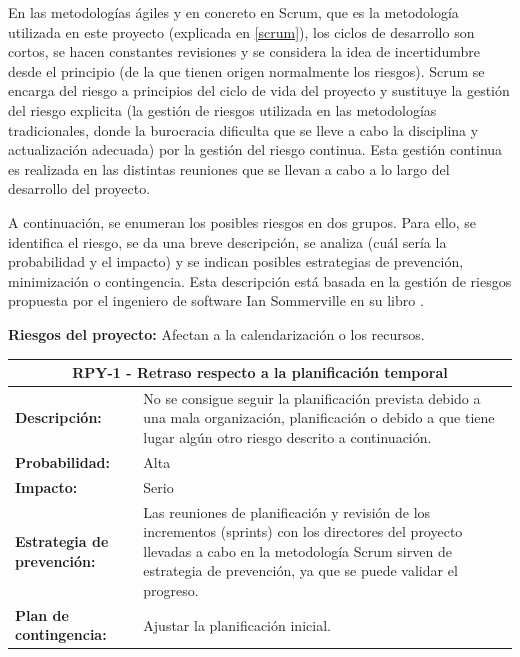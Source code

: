 En las metodologías ágiles y en concreto en Scrum, que es la metodología utilizada en este proyecto (explicada en \ref{scrum}), los ciclos de desarrollo son cortos, se hacen constantes revisiones y se considera la idea de incertidumbre desde el principio (de la que tienen origen normalmente los riesgos). Scrum se encarga del riesgo a principios del ciclo de vida del proyecto y sustituye la gestión del riesgo explicita (la gestión de riesgos utilizada en las metodologías tradicionales, donde la burocracia dificulta que se lleve a cabo la disciplina y actualización adecuada) por la gestión del riesgo continua. Esta gestión continua es realizada en las distintas reuniones que se llevan a cabo a lo largo del desarrollo del proyecto.

A continuación, se enumeran los posibles riesgos en dos grupos. Para ello, se identifica el riesgo, se da una breve descripción, se analiza (cuál sería la probabilidad y el impacto) y se indican posibles estrategias de prevención, minimización o contingencia. Esta descripción está basada en la gestión de riesgos propuesta por el ingeniero de software Ian Sommerville en su libro \cite{sommerville}.

\noindent
\textbf{Riesgos del proyecto:} Afectan a la calendarización o los recursos.

\begin{table}[H]
	\begin{tabular}{| p{4cm}| p{10cm} |}
		\hline
		\multicolumn{2}{|c|}{\textbf{RPY-1} - Retraso respecto a la planificación temporal} \\ \hline
		\textbf{Descripción:} & No se consigue seguir la planificación prevista debido a una mala organización, planificación o debido a que tiene lugar algún otro riesgo descrito a continuación. \\ \hline
		\textbf{Probabilidad:} & Alta \\ \hline
		\textbf{Impacto:} & Serio \\ \hline
		\textbf{Estrategia de prevención:} & Las reuniones de planificación y revisión de los incrementos (sprints) con los directores del proyecto llevadas a cabo en la metodología Scrum sirven de estrategia de prevención, ya que se puede validar el progreso. \\ \hline
		\textbf{Plan de contingencia:} & Ajustar la planificación inicial. \\ \hline
	\end{tabular}
\end{table}

